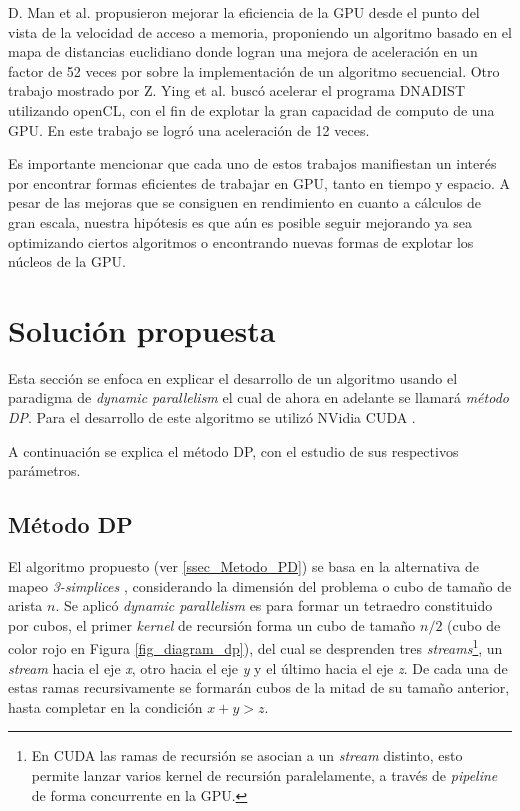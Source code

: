 \documentclass[10pt, conference, compsocconf, onecolumn]{IEEEtran}
\begin{document}
 D. Man et al. \cite{AGPUEuclideanDis} propusieron mejorar la eficiencia de la GPU desde el punto del vista de la velocidad de acceso a memoria, proponiendo un algoritmo basado en el mapa de distancias euclidiano donde logran una mejora de aceleraci\'on en un factor de 52 veces por sobre la implementaci\'on de un algoritmo secuencial. Otro trabajo mostrado por Z. Ying et al. \cite{DNAGPU2011} busc\'o acelerar el programa DNADIST utilizando openCL, con el fin de explotar la gran capacidad de computo de una GPU. En este trabajo se logr\'o una aceleraci\'on de 12 veces.

 

Es importante mencionar que cada uno de estos trabajos manifiestan un inter\'es por encontrar formas eficientes de trabajar en GPU, tanto en tiempo y espacio. A pesar de las mejoras que se consiguen en rendimiento en cuanto a c\'alculos de gran escala, nuestra hip\'otesis es que a\'un es posible seguir mejorando ya sea optimizando ciertos algoritmos o encontrando nuevas formas de explotar los n\'ucleos de la GPU. 

\section{Soluci\'on propuesta}
\label{sec_implementacion}


Esta secci\'on se enfoca en explicar el desarrollo de un algoritmo usando el paradigma de \textit{dynamic parallelism} el cual de ahora en adelante se llamar\'a \textit{m\'etodo DP}. Para el desarrollo de este algoritmo se utiliz\'o NVidia CUDA \cite{Nvidia2016}.

A continuaci\'on se explica el m\'etodo DP, con el estudio de sus respectivos par\'ametros. 


\subsection{M\'etodo DP}



El algoritmo propuesto (ver \ref{ssec_Metodo_PD}) se basa en la alternativa de mapeo \textit{3-simplices} \cite{PossiRec2016}, considerando la dimensi\'on del problema o cubo de tama\~no de arista $n$. Se aplic\'o \textit{dynamic parallelism} es para formar un tetraedro constituido por cubos, el primer \textit{kernel} de recursi\'on forma un cubo de tama\~no $n/2$ (cubo de color rojo en Figura \ref{fig_diagram_dp}), del cual se desprenden tres \textit{streams}\footnote{En CUDA las ramas de recursi\'on se asocian a un \textit{stream} distinto, esto permite lanzar varios kernel de recursi\'on paralelamente, a trav\'es de \textit{pipeline} de forma concurrente en la GPU.}, un \textit{stream} hacia el eje \textit{x}, otro hacia el eje \textit{y} y el \'ultimo hacia el eje \textit{z}. De cada una de estas ramas recursivamente se formar\'an  cubos de la mitad de su tama\~no anterior, hasta completar en la condici\'on $x+y>z$.
\end{document}

